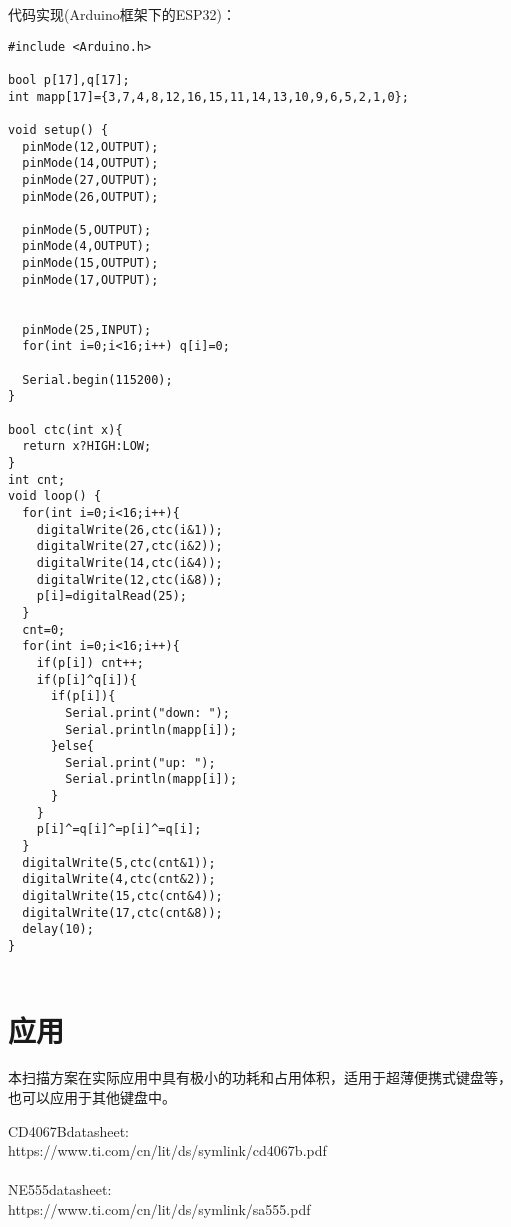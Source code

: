\documentclass[UTF8]{ctexart}
\begin{document}
		\newpage
		
		代码实现(Arduino框架下的ESP32)：
		
		\begin{lstlisting}
#include <Arduino.h>

bool p[17],q[17];
int mapp[17]={3,7,4,8,12,16,15,11,14,13,10,9,6,5,2,1,0};

void setup() {
  pinMode(12,OUTPUT);
  pinMode(14,OUTPUT);
  pinMode(27,OUTPUT);
  pinMode(26,OUTPUT);

  pinMode(5,OUTPUT);
  pinMode(4,OUTPUT);
  pinMode(15,OUTPUT);
  pinMode(17,OUTPUT);


  pinMode(25,INPUT);
  for(int i=0;i<16;i++) q[i]=0;

  Serial.begin(115200);
}

bool ctc(int x){
  return x?HIGH:LOW;
}
int cnt;
void loop() {
  for(int i=0;i<16;i++){
    digitalWrite(26,ctc(i&1));
    digitalWrite(27,ctc(i&2));
    digitalWrite(14,ctc(i&4));
    digitalWrite(12,ctc(i&8));
    p[i]=digitalRead(25);
  }
  cnt=0;
  for(int i=0;i<16;i++){
    if(p[i]) cnt++;
    if(p[i]^q[i]){
      if(p[i]){
        Serial.print("down: ");
        Serial.println(mapp[i]);
      }else{
        Serial.print("up: ");
        Serial.println(mapp[i]);
      }
    }
    p[i]^=q[i]^=p[i]^=q[i];
  }
  digitalWrite(5,ctc(cnt&1));
  digitalWrite(4,ctc(cnt&2));
  digitalWrite(15,ctc(cnt&4));
  digitalWrite(17,ctc(cnt&8));
  delay(10);
}


		\end{lstlisting}
		
	\newpage
	
	\section{应用}
		\indent 本扫描方案在实际应用中具有极小的功耗和占用体积，适用于超薄便携式键盘等，也可以应用于其他键盘中。
		
	\newpage
	
	\begin{thebibliography}{99}  
		CD4067B\space datasheet:\\
		\indent https://www.ti.com/cn/lit/ds/symlink/cd4067b.pdf\\\\
		NE555\space datasheet:\\
		\indent https://www.ti.com/cn/lit/ds/symlink/sa555.pdf
	
	\end{thebibliography}
\end{document}
